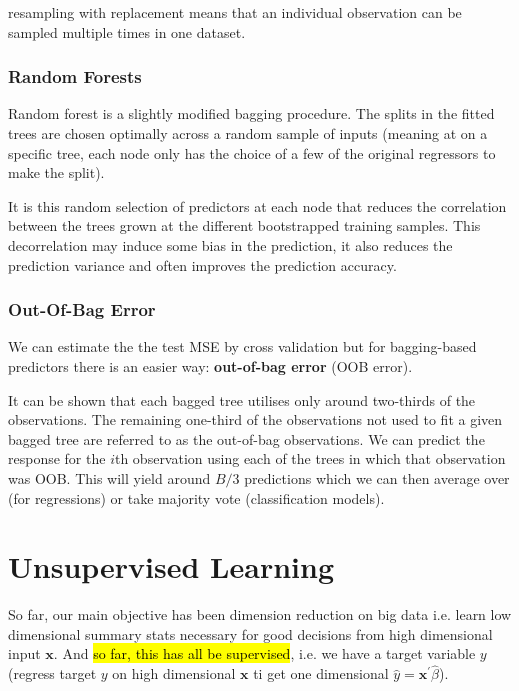 \documentclass[11pt]{article}
\begin{document}
\begin{note}
    resampling with replacement means that an individual observation can be sampled multiple times in one dataset.
\end{note}
\subsubsection{Random Forests}

Random forest is a slightly modified bagging procedure. The splits in the fitted trees are chosen optimally across a random sample of inputs (meaning at on a specific tree, each node only has the choice of a few of the original regressors to make the split).

It is this random selection of predictors at each node that reduces the correlation between the trees grown at the different bootstrapped training samples. This decorrelation may induce some bias in the prediction, it also reduces the prediction variance and often improves the prediction accuracy.

\subsubsection{Out-Of-Bag Error}

We can estimate the the test MSE by cross validation but for bagging-based predictors there is an easier way: \textbf{out-of-bag error} (OOB error).

It can be shown that each bagged tree utilises only around two-thirds of the observations. The remaining one-third of the observations not used to fit a given bagged tree are referred to as the out-of-bag observations. We can predict the response for the $i$th observation using each of the trees in which that observation was OOB. This will yield around $B/3$ predictions which we can then average over (for regressions) or take majority vote (classification models).

\newpage

\section{Unsupervised Learning}

So far, our main objective has been dimension reduction on big data  i.e. learn low dimensional summary stats necessary for good decisions from high dimensional input $\mathbf{x}$. And \hl{so far, this has all be supervised}, i.e. we have a target variable $y$ (regress target $y$ on high dimensional $\mathbf{x}$ ti get one dimensional $\hat{y} = \mathbf{x}^\prime\hat{\beta}$).
\end{document}
